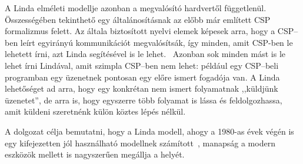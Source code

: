 A Linda elméleti modellje azonban a megvalósító hardvertől függetlenül.
Összességében tekinthető egy általánosításnak az előbb már említett CSP formalizmus felett.
Az általa biztosított nyelvi elemek képesek arra, hogy a CSP--ben leírt egyirányú kommunikációt megvalósítsák, így minden, amit CSP-ben le lehetett írni, azt Linda segítésével is le lehet.~\cite{gelernter_generative_1985}
Azonban sok minden mást is le lehet írni Lindával, amit szimpla CSP--ben nem lehet: például egy CSP--beli programban egy üzenetnek pontosan egy előre ismert fogadója van.
A Linda lehetőséget ad arra, hogy egy konkrétan nem ismert folyamatnak ,,küldjünk üzenetet'', de arra is, hogy egyszerre több folyamat is lássa és feldolgozhassa, amit küldeni szeretnénk külön köztes lépés nélkül.

A dolgozat célja bemutatni, hogy a Linda modell, ahogy a 1980-as évek végén is egy kifejezetten jól használható modellnek számított~\cite{carriero_linda_1989}, manapság a modern eszközök mellett is nagyszerűen megállja a helyét.


